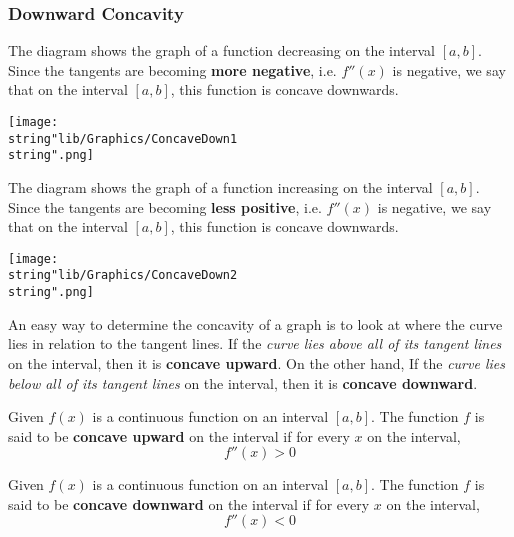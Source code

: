 \documentclass[11pt,a4paper]{book}
\begin{document}
\subsubsection{Downward Concavity}

\begin{minipage}[t]{0.6\textwidth}

The diagram shows the graph of a function decreasing on the interval
$\left[a,b\right]$. Since the tangents are becoming \textbf{more
negative}, i.e. $f''(x)$ is negative, we say that on the interval
$\left[a,b\right]$, this function is concave downwards.

\end{minipage}
\begin{minipage}[t]{0.1\textwidth}
\begin{center}
\texttt{[image: \\string"lib/Graphics/ConcaveDown1\\string".png]}
\par\end{center}

\end{minipage}

\begin{minipage}[t]{0.6\textwidth}

The diagram shows the graph of a function increasing on the interval
$\left[a,b\right]$. Since the tangents are becoming \textbf{less
positive}, i.e. $f''(x)$ is negative, we say that on the interval
$\left[a,b\right]$, this function is concave downwards.

\end{minipage}
\begin{minipage}[t]{0.1\textwidth}

\hspace{2cm}\texttt{[image: \\string"lib/Graphics/ConcaveDown2\\string".png]}

\end{minipage}

An easy way to determine the concavity of a graph is to look at where
the curve lies in relation to the tangent lines. If the \textit{curve
lies above all of its tangent lines} on the interval, then it is \textbf{concave
upward}. On the other hand, If the \textit{curve lies below all of
its tangent lines} on the interval, then it is \textbf{concave downward}.

\begin{tcolorbox}[colback=blue!5, colframe=black, boxrule=.4pt, sharpish corners]

Given $f(x)$ is a continuous function on an interval $\left[a,b\right]$.
The function $f$ is said to be \textbf{concave upward} on the interval
if for every $x$ on the interval,
\[
f''(x)>0
\]

Given $f(x)$ is a continuous function on an interval $\left[a,b\right]$.
The function $f$ is said to be \textbf{concave downward} on the interval
if for every $x$ on the interval,
\[
f''(x)<0
\]
\end{tcolorbox}
\end{document}

